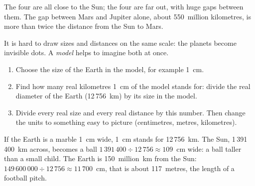 The four  are all close to the Sun; the four  are
far out, with huge gaps between them. The gap between Mars and Jupiter alone, about 550~million kilometres, is more than twice the distance from the Sun to Mars.

It is hard to draw sizes and distances on the same scale: the planets
become invisible dots. A \emph{ model} helps to imagine both at once.

\begin{method}\label{met:g6:earth-a-planet:scale-model}
\begin{enumerate}
  \item Choose the size of the Earth in the model, for example 1~cm.
  \item Find how many real kilometres 1~cm of the model stands for: divide
        the real diameter of the Earth (12\,756~km) by its size in the model.
  \item Divide every real size and every real distance by this number.
        Then change the units to something easy to picture (centimetres,
        metres, kilometres).
\end{enumerate}
\end{method}

\begin{example}\label{ex:g6:earth-a-planet:marble}
If the Earth is a marble 1~cm wide, 1~cm stands for 12\,756~km. The Sun,
1\,391\,400~km across, becomes a ball $1\,391\,400 \div 12\,756 \approx
109$~cm wide: a ball taller than a small child. The Earth is
150~million~km from the Sun: $149\,600\,000 \div 12\,756 \approx 11\,700$~cm,
that is about 117~metres, the length of a football pitch.
\end{example}

